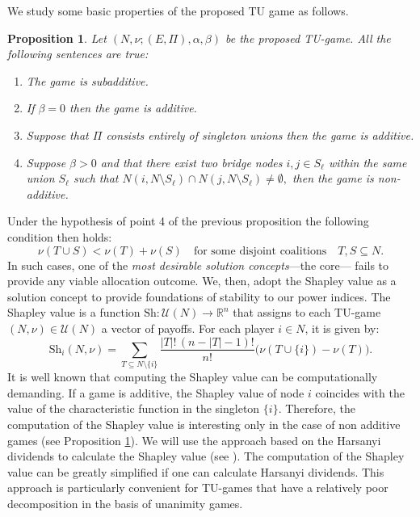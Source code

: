 \documentclass[preprint,11pt,authoryear]{elsarticle}
\theoremstyle{plain}
\newtheorem{proposition}[theorem]{Proposition}
\begin{document}
We study some basic properties of the proposed TU game as follows.
\begin{proposition}\label{cic}
Let \( (N, \nu; (E, \Pi), \alpha, \beta) \) be the proposed TU-game. All the following sentences are true:
\begin{enumerate}
\item
The game is subadditive.
\item
If \( \beta = 0 \) then the game is additive.
\item
Suppose that \( \Pi \) consists entirely of singleton unions then the game is additive.
\item
Suppose $\beta >0$ and that there exist two bridge nodes \( i, j \in S_\ell \) within the same union \( S_\ell \) such that
$
N(i, N \setminus S_\ell) \cap N(j, N \setminus S_\ell) \neq \emptyset,$
then the game is non-additive.
\end{enumerate}
\end{proposition}
Under the hypothesis of point 4 of the previous proposition the following condition then holds:
\begin{equation}\label{stadd}
\nu(T \cup S) < \nu(T) + \nu(S) \quad \mbox{for some disjoint coalitions} \quad T, S \subseteq N.
\end{equation}
In such cases, one of the \textit{most desirable solution concepts}—the core— fails to provide any viable allocation outcome. We, then, adopt the Shapley value as a solution concept to provide foundations of stability to our power indices.
The Shapley value is a function \( \mathrm{Sh} : \mathcal{U}(N) \to \mathbb{R}^n \) that assigns to each TU-game \( (N, \nu) \in \mathcal{U}(N) \) a vector of payoffs. For each player \( i \in N \), it is given by:
\[
\mathrm{Sh}_i(N, \nu) = \sum_{T \subseteq N \setminus \{i\}} \frac{|T|!\, (n - |T| - 1)!}{n!} \Big( \nu(T \cup \{i\}) - \nu(T) \Big).
\]
It is well known that computing the Shapley value can be computationally demanding.
If a game is additive, the Shapley value of node $i$ coincides with the value of the characteristic function in the singleton $\{i\}$. Therefore, the computation of the Shapley value is interesting only in the case of non additive games (see Proposition \ref{cic}).  We will use the approach based on the Harsanyi dividends to calculate the Shapley value (see \citep{harsanyi1959bargaining, billot2005share}). 
The computation of the Shapley value can be greatly simplified if one can calculate Harsanyi dividends. This approach is particularly convenient for TU-games that have a relatively poor decomposition in the basis of unanimity games.
\end{document}
